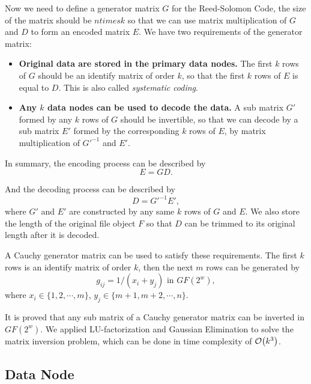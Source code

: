 \documentclass[conference]{IEEEtran}
\begin{document}
Now we need to define a generator matrix $G$ for the Reed-Solomon Code, the size of the matrix should be $n times k$ so that we can use matrix multiplication of $G$ and $D$ to form an encoded matrix $E$. We have two requirements of the generator matrix:
\begin{itemize}
    \item \textbf{Original data are stored in the primary data nodes.} The first $k$ rows of $G$ should be an identify matrix of order $k$, so that the first $k$ rows of $E$ is equal to $D$. This is also called \textit{systematic coding}\cite{ph:13:tut}.
    \item \textbf{Any $k$ data nodes can be used to decode the data.} A sub matrix $G'$ formed by any $k$ rows of $G$ should be invertible, so that we can decode by a sub matrix $E'$ formed by the corresponding $k$ rows of $E$, by matrix multiplication of $G'^{-1}$ and $E'$.
\end{itemize}

In summary, the encoding process can be described by
\begin{equation}
    E = GD.
\end{equation}

And the decoding process can be described by
\begin{equation}
    D = G'^{-1}E',
\end{equation}
where $G'$ and $E'$ are constructed by any same $k$ rows of $G$ and $E$. We also store the length of the original file object $F$ so that $D$ can be trimmed to its original length after it is decoded.  

A Cauchy generator matrix can be used to satisfy these requirements. The first $k$ rows is an identify matrix of order $k$, then the next $m$ rows can be generated by
\begin{equation}
    g_{ij} = 1 / (x_i + y_j) \text{ in } GF(2^w),
\end{equation}
where $x_i\in\{1,2,\cdots,m\}$, $y_j\in\{m+1,m+2,\cdots,n\}$.

It is proved that any sub matrix of a Cauchy generator matrix can be inverted in $GF(2^w)$\cite{roth1989mds}. We applied LU-factorization and Gaussian Elimination to solve the matrix inversion problem, which can be done in time complexity of $\order{k^3}$.

\subsection{Data Node}
\end{document}
